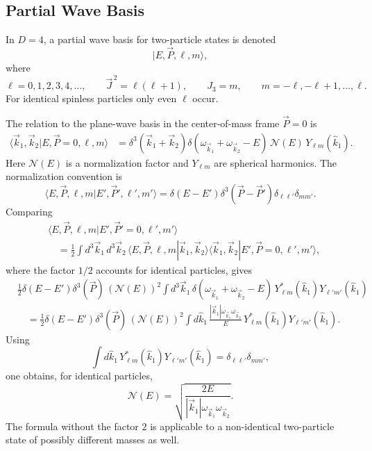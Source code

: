 \subsection*{Partial Wave Basis}

In \(D=4\), a partial wave basis for two-particle states is denoted
\[
  |E,\vec P,\ell,m\rangle,
\]
where
\[
  \ell=0,1,2,3,4,\ldots,\qquad
  \vec J^{\,2}=\ell(\ell+1),\qquad
  J_3=m,\qquad
  m=-\ell,-\ell+1,\ldots,\ell.
\]
For identical spinless particles only even \(\ell\) occur.

The relation to the plane-wave basis in the center-of-mass frame
\(\vec P=0\) is
\[
\begin{aligned}
\langle \vec k_1,\vec k_2|E,\vec P=0,\ell,m\rangle
&=
\delta^3(\vec k_1+\vec k_2)
\delta(\omega_{\vec k_1}+\omega_{\vec k_2}-E)
\,\mathcal N(E)\,Y_{\ell m}(\hat k_1).
\end{aligned}
\]
Here \(\mathcal N(E)\) is a normalization factor and \(Y_{\ell m}\) are
spherical harmonics. The normalization convention is
\[
  \langle E,\vec P,\ell,m|E',\vec P',\ell',m'\rangle
  =
  \delta(E-E')\delta^3(\vec P-\vec P')\delta_{\ell\ell'}\delta_{mm'}.
\]
Comparing
\[
\begin{aligned}
&\langle E,\vec P,\ell,m|E',\vec P'=0,\ell',m'\rangle
\\
&\quad =
\frac12\int d^3\vec k_1\,d^3\vec k_2\,
\langle E,\vec P,\ell,m|\vec k_1,\vec k_2\rangle
\langle \vec k_1,\vec k_2|E',\vec P=0,\ell',m'\rangle ,
\end{aligned}
\]
where the factor \(1/2\) accounts for identical particles, gives
\[
\begin{aligned}
&\frac12\delta(E-E')\delta^3(\vec P)\,(\mathcal N(E))^2
\int d^3\vec k_1\,
\delta(\omega_{\vec k_1}+\omega_{\vec k_2}-E)\,
Y_{\ell m}^*(\hat k_1)Y_{\ell' m'}(\hat k_1)
\\
&\quad =
\frac12\delta(E-E')\delta^3(\vec P)\,(\mathcal N(E))^2
\int d\hat k_1\,
\frac{|\vec k_1|\omega_{\vec k_1}\omega_{\vec k_2}}{E}\,
Y_{\ell m}^*(\hat k_1)Y_{\ell' m'}(\hat k_1).
\end{aligned}
\]
Using
\[
  \int d\hat k_1\,
  Y_{\ell m}^*(\hat k_1)Y_{\ell' m'}(\hat k_1)
  =
  \delta_{\ell\ell'}\delta_{mm'},
\]
one obtains, for identical particles,
\[
  \mathcal N(E)
  =
  \sqrt{\frac{2E}{
  |\vec k_1|\omega_{\vec k_1}\omega_{\vec k_2}}}.
\]
The formula without the factor \(2\) is applicable to a non-identical
two-particle state of possibly different masses as well.

